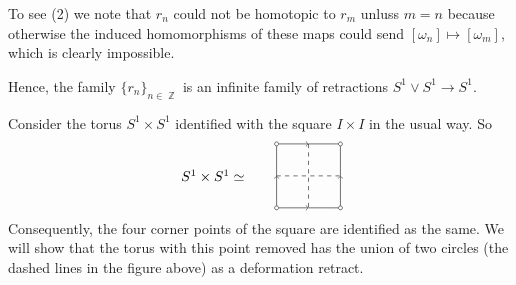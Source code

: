 \documentclass{article}
\DeclareMathOperator{\Z}{\mathbb{Z}}
\newcommand{\exercise}[1]{\noindent{\textbf{Exercise #1:}}}
\begin{document}
To see (2) we note that $r_n$ could not be homotopic to $r_m$ unluss
$m=n$ because otherwise the induced homomorphisms of these maps could
send $[\omega_n] \mapsto [\omega_m]$, which is clearly impossible.

Hence, the family $\{r_n\}_{n\in \Z}$ is an infinite family of
retractions $S^1 \vee S^1 \to S^1$.

\exercise{0.1}

Consider the torus $S^1 \times S^1$ identified with the square
$I\times I$ in the usual way. So
\[
\begin{tikzpicture}[scale=.8]
  \node (L) at (-3,0) {$S^1 \times S^1 \simeq$};
  \node[draw,circle,inner sep=1pt,fill=none] (TL) at (-1,1) {};
  \node[draw,circle,inner sep=1pt,fill=none] (BL) at (-1,-1) {};
  \node[draw,circle,inner sep=1pt,fill=none] (TR) at (1,1) {};
  \node[draw,circle,inner sep=1pt,fill=none] (BR) at (1,-1) {};
  \draw[->] (TL) -- (0,1);
  \draw (0,1) -- (TR);
  \draw (TR) -- (1,0);
  \draw[->] (BR) -- (1,0);
  \draw[->] (BL) -- (0,-1);
  \draw (0,-1) -- (BR);
  \draw[->] (BL) -- (-1,0);
  \draw (TL) -- (-1,0);
  \draw[dashed] (0,1) -- (0,-1);
  \draw[dashed] (-1,0) -- (1,0);
\end{tikzpicture}
\]
Consequently, the four corner points of the square are identified as the
same. We will show that the torus with this point removed has the
union of two circles (the dashed lines in the figure above) as a
deformation retract.
\end{document}
